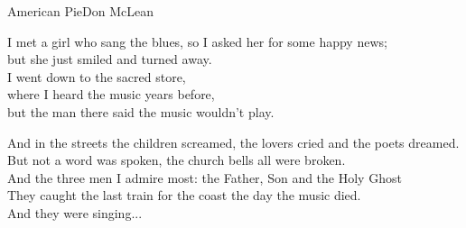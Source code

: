 \begin{song}{American Pie}{Don McLean}

\begin{guitar}
I met a girl who sang the blues, so I asked her for some happy news;\\
but she just smiled and turned away.\\
I went down to the sacred store,\\
where I heard the music years before,\\
but the man there said the music wouldn't play. \\
\end{guitar}

\begin{guitar}
And in the streets the children screamed, the lovers cried and the poets dreamed.\\
But not a word was spoken, the church bells all were broken.\\
And the three men I admire most: the Father, Son and the Holy Ghost\\
They caught the last train for the coast the day the music died.\\
And they were singing...\\
\end{guitar}

\end{song}
